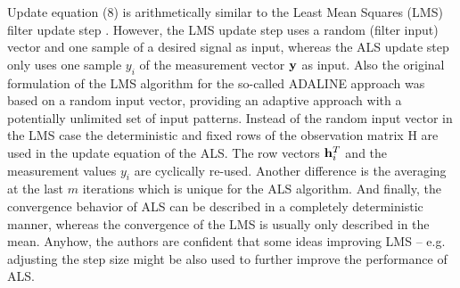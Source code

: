 \documentclass{article}
\begin{document}
Update equation (8) is arithmetically similar to the Least Mean Squares 
(LMS) filter update step \cite{LMS}. However, the LMS update step uses a random 
(filter input) vector and one sample of a desired signal as input, whereas the ALS 
update step only uses one sample $y_i$ of the measurement vector $\bf y$ as input. 
Also the original formulation of the LMS algorithm for the so-called 
ADALINE \cite{LMS_first, ADALINE}
approach was based on a random input vector, providing an adaptive 
approach with a potentially unlimited set of input patterns.
Instead 
of the random input vector in the LMS case the deterministic and fixed rows of the 
observation matrix H are used in the update equation of the ALS. The row vectors 
${\bf h}_i^T$ and the measurement values $y_i$ are cyclically re-used. 
Another difference is 
the averaging at the last $m$ iterations which is unique for the ALS algorithm. And 
finally, the convergence behavior of ALS can be described in a completely 
deterministic manner, whereas the convergence of the LMS is usually only described 
in the mean. Anyhow, the authors are confident that some ideas improving LMS -- e.g. adjusting the 
step size \cite{LMS_variable, LMS_variable2} 
might be also
used to further improve the performance of ALS. 
\end{document}
